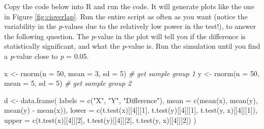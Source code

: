 \documentclass[
  oneside]{krantz}
\makeatletter
\newenvironment{Shaded}{\begin{snugshade}}{\end{snugshade}}
\newcommand{\AttributeTok}[1]{\textcolor[rgb]{0.61,0.61,0.61}{#1}}
\newcommand{\CommentTok}[1]{\textcolor[rgb]{0.37,0.37,0.37}{\textit{#1}}}
\newcommand{\DecValTok}[1]{\textcolor[rgb]{0.06,0.06,0.06}{#1}}
\newcommand{\FunctionTok}[1]{\textcolor[rgb]{0,0,0}{#1}}
\newcommand{\NormalTok}[1]{#1}
\newcommand{\OtherTok}[1]{\textcolor[rgb]{0.37,0.37,0.37}{#1}}
\newcommand{\SpecialCharTok}[1]{\textcolor[rgb]{0,0,0}{#1}}
\newcommand{\StringTok}[1]{\textcolor[rgb]{0.5,0.5,0.5}{#1}}
\newenvironment{kframe}{%
\medskip{}
\setlength{\fboxsep}{.8em}
 \def\at@end@of@kframe{}%
 \ifinner\ifhmode%
  \def\at@end@of@kframe{\end{minipage}}%
  \begin{minipage}{\columnwidth}%
 \fi\fi%
 \def\FrameCommand##1{\hskip\@totalleftmargin \hskip-\fboxsep
 \colorbox{shadecolor}{##1}\hskip-\fboxsep
     \hskip-\linewidth \hskip-\@totalleftmargin \hskip\columnwidth}%
 \MakeFramed {\advance\hsize-\width
   \@totalleftmargin\z@ \linewidth\hsize
   \@setminipage}}%
 {\par\unskip\endMakeFramed%
 \at@end@of@kframe}
\renewenvironment{Shaded}{\begin{kframe}}{\end{kframe}}
\makeatother
\begin{document}
Copy the code below into R and run the code. It will generate plots like the one in Figure \ref{fig:cioverlap}. Run the entire script as often as you want (notice the variability in the \emph{p}-values due to the relatively low power in the test!), to answer the following question. The \emph{p}-value in the plot will tell you if the difference is statistically significant, and what the \emph{p}-value is. Run the simulation until you find a \emph{p}-value close to \emph{p} = 0.05.

\begin{Shaded}
\begin{Highlighting}[]
\NormalTok{x }\OtherTok{\textless{}{-}} \FunctionTok{rnorm}\NormalTok{(}\AttributeTok{n =} \DecValTok{50}\NormalTok{, }\AttributeTok{mean =} \DecValTok{3}\NormalTok{, }\AttributeTok{sd =} \DecValTok{5}\NormalTok{) }\CommentTok{\# get sample group 1}
\NormalTok{y }\OtherTok{\textless{}{-}} \FunctionTok{rnorm}\NormalTok{(}\AttributeTok{n =} \DecValTok{50}\NormalTok{, }\AttributeTok{mean =} \DecValTok{5}\NormalTok{, }\AttributeTok{sd =} \DecValTok{5}\NormalTok{) }\CommentTok{\# get sample group 2}

\NormalTok{d }\OtherTok{\textless{}{-}} \FunctionTok{data.frame}\NormalTok{(}
  \AttributeTok{labels =} \FunctionTok{c}\NormalTok{(}\StringTok{"X"}\NormalTok{, }\StringTok{"Y"}\NormalTok{, }\StringTok{"Difference"}\NormalTok{),}
  \AttributeTok{mean =} \FunctionTok{c}\NormalTok{(}\FunctionTok{mean}\NormalTok{(x), }\FunctionTok{mean}\NormalTok{(y), }\FunctionTok{mean}\NormalTok{(y) }\SpecialCharTok{{-}} \FunctionTok{mean}\NormalTok{(x)),}
  \AttributeTok{lower =} \FunctionTok{c}\NormalTok{(}\FunctionTok{t.test}\NormalTok{(x)[[}\DecValTok{4}\NormalTok{]][}\DecValTok{1}\NormalTok{], }\FunctionTok{t.test}\NormalTok{(y)[[}\DecValTok{4}\NormalTok{]][}\DecValTok{1}\NormalTok{], }\FunctionTok{t.test}\NormalTok{(y, x)[[}\DecValTok{4}\NormalTok{]][}\DecValTok{1}\NormalTok{]),}
  \AttributeTok{upper =} \FunctionTok{c}\NormalTok{(}\FunctionTok{t.test}\NormalTok{(x)[[}\DecValTok{4}\NormalTok{]][}\DecValTok{2}\NormalTok{], }\FunctionTok{t.test}\NormalTok{(y)[[}\DecValTok{4}\NormalTok{]][}\DecValTok{2}\NormalTok{], }\FunctionTok{t.test}\NormalTok{(y, x)[[}\DecValTok{4}\NormalTok{]][}\DecValTok{2}\NormalTok{])}
\NormalTok{)}


\end{Highlighting}
\end{Shaded}
\end{document}
